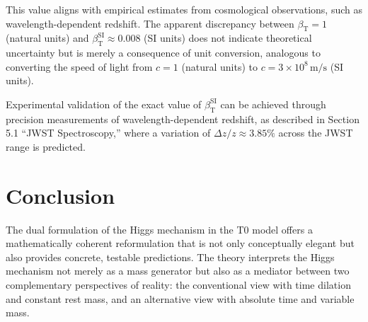 \documentclass[a4paper,12pt]{article}
\newcommand{\betaT}{\beta_{\text{T}}}
\begin{document}
This value aligns with empirical estimates from cosmological observations, such as wavelength-dependent redshift. The apparent discrepancy between \(\betaT = 1\) (natural units) and \(\betaT^{\text{SI}} \approx 0.008\) (SI units) does not indicate theoretical uncertainty but is merely a consequence of unit conversion, analogous to converting the speed of light from \(c = 1\) (natural units) to \(c = 3 \times 10^8 \, \text{m/s}\) (SI units).

Experimental validation of the exact value of \(\betaT^{\text{SI}}\) can be achieved through precision measurements of wavelength-dependent redshift, as described in Section 5.1 ``JWST Spectroscopy,'' where a variation of \(\Delta z / z \approx 3.85\%\) across the JWST range is predicted.
	
	\section{Conclusion}
	The dual formulation of the Higgs mechanism in the T0 model offers a mathematically coherent reformulation that is not only conceptually elegant but also provides concrete, testable predictions. The theory interprets the Higgs mechanism not merely as a mass generator but also as a mediator between two complementary perspectives of reality: the conventional view with time dilation and constant rest mass, and an alternative view with absolute time and variable mass.
	
\end{document}
